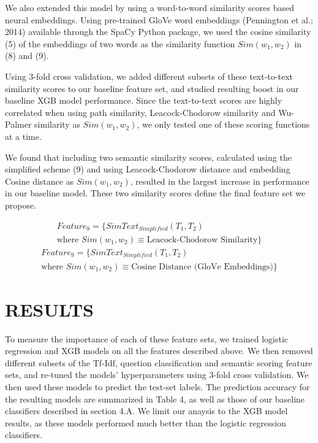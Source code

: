 \documentclass[letterpaper, 10 pt, conference]{ieeeconf}  %
\begin{document}
We also extended this model by using a word-to-word similarity scores based neural embeddings. Using pre-trained GloVe word embeddings (Pennington et al.; 2014) available through the SpaCy Python package, we used the cosine similarity (5) of the embeddings of two words as the similarity function $Sim(w_1,w_2)$ in (8) and (9). 

Using 3-fold cross validation, we added different subsets of these text-to-text similarity scores to our baseline feature set, and studied resulting boost in our baseline XGB model performance. Since the text-to-text scores are highly correlated when using path similarity, Leacock-Chodorow similarity and Wu-Palmer similarity as $Sim(w_1, w_2)$, we only tested one of these scoring functions at a time. 

We found that including two semantic similarity scores, calculated using the simplified scheme (9) and using Leacock-Chodorow distance and embedding Cosine distance as $Sim(w_1, w_2)$, resulted in the largest increase in performance in our baseline model. These two similarity scores define the final feature set we propose. 

\begin{gather*} \tag{10}
Feature_{8} = \{SimText_{Simplified}(T_1, T_2) \\ \text{where } Sim(w_1, w_2) \equiv \text{Leacock-Chodorow Similarity}\}
\end{gather*}
\begin{gather*} \tag{11}
Feature_{9} = \{SimText_{Simplified}(T_1, T_2) \\ \text{where } Sim(w_1, w_2) \equiv \text{Cosine Distance (GloVe Embeddings)}\}
\end{gather*}


\section{RESULTS}

To measure the importance of each of these feature sets, we trained logistic regression and XGB models on all the features described above. We then removed different subsets of the Tf-Idf, question classification and semantic scoring feature sets, and re-tuned the models’ hyperparameters using 3-fold cross validation. We then used these models to predict the test-set labels. The prediction accuracy for the resulting models are summarized in Table 4, as well as those of our baseline classifiers described in section 4.A. We limit our anaysis to the XGB model results, as these models performed much better than the logistic regression classifiers. 
\end{document}
